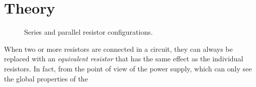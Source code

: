 \documentclass[12pt]{article}
\begin{document}
\section{Theory}
\label{sec:theory}

\begin{figure}
  \centering
     \qquad
  \caption{Series and parallel resistor configurations.}
  \label{fig:combinations}
\end{figure}
When two or more resistors are connected in a circuit, they can always
be replaced with an \textit{equivalent resistor} that has the same
effect as the individual resistors.  In fact, from the point of view
of the power supply, which can only see the global properties of the
\end{document}
